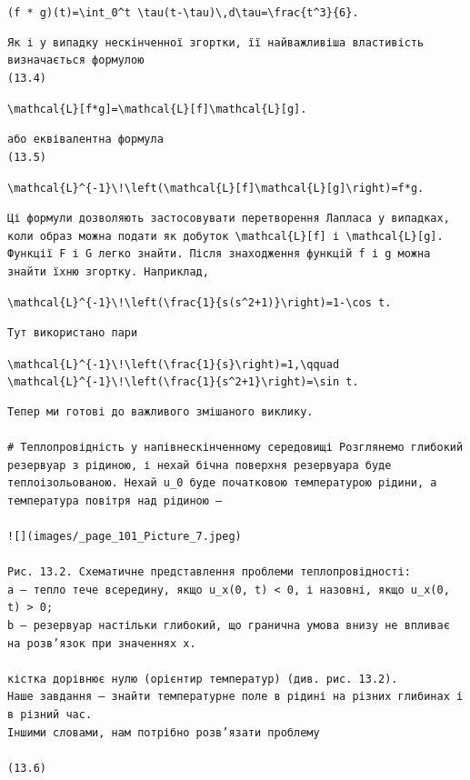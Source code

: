 \documentclass[
  ukrainian,
]{article}
\begin{document}
\texttt{(f\ *\ g)(t)=\textbackslash{}int\_0\^{}t\ \textbackslash{}tau(t-\textbackslash{}tau)\textbackslash{},d\textbackslash{}tau=\textbackslash{}frac\{t\^{}3\}\{6\}.}

\begin{verbatim}
Як і у випадку нескінченної згортки, її найважливіша властивість визначається формулою
(13.4)
\end{verbatim}

\texttt{\textbackslash{}mathcal\{L\}{[}f*g{]}=\textbackslash{}mathcal\{L\}{[}f{]}\textbackslash{}mathcal\{L\}{[}g{]}.}

\begin{verbatim}
або еквівалентна формула
(13.5)
\end{verbatim}

\texttt{\textbackslash{}mathcal\{L\}\^{}\{-1\}\textbackslash{}!\textbackslash{}left(\textbackslash{}mathcal\{L\}{[}f{]}\textbackslash{}mathcal\{L\}{[}g{]}\textbackslash{}right)=f*g.}

\begin{verbatim}
Ці формули дозволяють застосовувати перетворення Лапласа у випадках, коли образ можна подати як добуток \mathcal{L}[f] і \mathcal{L}[g].
Функції F і G легко знайти. Після знаходження функцій f і g можна знайти їхню згортку. Наприклад,
\end{verbatim}

\texttt{\textbackslash{}mathcal\{L\}\^{}\{-1\}\textbackslash{}!\textbackslash{}left(\textbackslash{}frac\{1\}\{s(s\^{}2+1)\}\textbackslash{}right)=1-\textbackslash{}cos\ t.}

\begin{verbatim}
Тут використано пари
\end{verbatim}

\texttt{\textbackslash{}mathcal\{L\}\^{}\{-1\}\textbackslash{}!\textbackslash{}left(\textbackslash{}frac\{1\}\{s\}\textbackslash{}right)=1,\textbackslash{}qquad}
\texttt{\textbackslash{}mathcal\{L\}\^{}\{-1\}\textbackslash{}!\textbackslash{}left(\textbackslash{}frac\{1\}\{s\^{}2+1\}\textbackslash{}right)=\textbackslash{}sin\ t.}

\begin{verbatim}
Тепер ми готові до важливого змішаного виклику.

# Теплопровідність у напівнескінченному середовищі Розглянемо глибокий резервуар з рідиною, і нехай бічна поверхня резервуара буде теплоізольованою. Нехай u_0 буде початковою температурою рідини, а температура повітря над рідиною —

![](images/_page_101_Picture_7.jpeg)

Рис. 13.2. Схематичне представлення проблеми теплопровідності:  
a — тепло тече всередину, якщо u_x(0, t) < 0, і назовні, якщо u_x(0, t) > 0;  
b — резервуар настільки глибокий, що гранична умова внизу не впливає на розв’язок при значеннях x.

кістка дорівнює нулю (орієнтир температур) (див. рис. 13.2).  
Наше завдання — знайти температурне поле в рідині на різних глибинах і в різний час.  
Іншими словами, нам потрібно розв’язати проблему

(13.6)
\end{verbatim}
\end{document}
